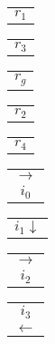 \documentclass{book}
\begin{document}
\stopmpxshipout
\mpxshipout%
{\small \renewcommand{\arraystretch}{.9}
              \circuitfont\begin{tabular}[t]{@{}r@{}}
                  $r_1$    
              \end{tabular}}%
\stopmpxshipout
\mpxshipout%
{\small \renewcommand{\arraystretch}{.9}
              \circuitfont\begin{tabular}[t]{@{}l@{}}
                  $r_3$    
              \end{tabular}}%
\stopmpxshipout
\mpxshipout%
{\small \renewcommand{\arraystretch}{.9}
              \circuitfont\begin{tabular}[b]{@{}c@{}}
                  $r_g$    
              \end{tabular}}%
\stopmpxshipout
\mpxshipout%
{\small \renewcommand{\arraystretch}{.9}
              \circuitfont\begin{tabular}[t]{@{}r@{}}
                  $r_2$    
              \end{tabular}}%
\stopmpxshipout
\mpxshipout%
{\small \renewcommand{\arraystretch}{.9}
              \circuitfont\begin{tabular}[t]{@{}l@{}}
                  $r_4$
              \end{tabular}}%
\stopmpxshipout
\mpxshipout%
{\small \renewcommand{\arraystretch}{.9}
              \begin{tabular}[t]{@{}c@{}}
                  $\longrightarrow$ \\ $i_0$     
              \end{tabular}}%
\stopmpxshipout
\mpxshipout%
{\small \renewcommand{\arraystretch}{.9}
              \begin{tabular}[t]{@{}r@{}}
                  $i_1 \downarrow$    
              \end{tabular}}%
\stopmpxshipout
\mpxshipout%
{\small \renewcommand{\arraystretch}{.9}
              \begin{tabular}[t]{@{}c@{}}
                  $\longrightarrow$ \\ $i_2$     
              \end{tabular}}%
\stopmpxshipout
\mpxshipout%
{\small \renewcommand{\arraystretch}{.9}
              \begin{tabular}[b]{@{}c@{}}
                   $i_3$ \\ $\longleftarrow$     
              \end{tabular}}%
\end{document}
